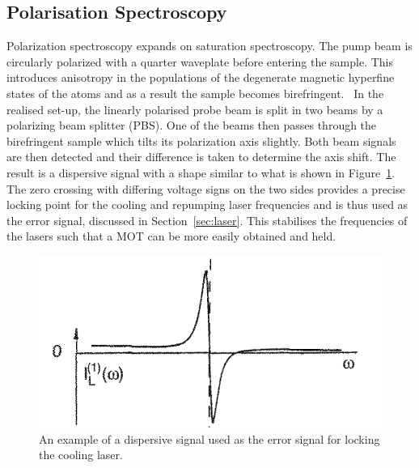 \documentclass[twocolumn]{article}
\begin{document}
\subsection{Polarisation Spectroscopy} \label{sec:pol} %
Polarization spectroscopy expands on saturation spectroscopy. The pump beam is circularly polarized with a quarter waveplate before entering the sample. This introduces anisotropy in the populations of the degenerate magnetic hyperfine states of the atoms and as a result the sample becomes birefringent.~\cite{demtroder} In the realised set-up, the linearly polarised probe beam is split in two beams by a polarizing beam splitter (PBS). One of the beams then passes through the birefringent sample which tilts its polarization axis slightly. Both beam signals are then detected and their difference is taken to determine the axis shift. The result is a dispersive signal with a shape similar to what is shown in Figure~\ref{fig:Dispersive}. The zero crossing with differing voltage signs on the two sides provides a precise locking point for the cooling and repumping laser frequencies and is thus used as the error signal, discussed in Section~\ref{sec:laser}. This stabilises the frequencies of the lasers such that a MOT can be more easily obtained and held.
\begin{figure} [!h]
\centering
\includegraphics[width=1\linewidth]{Images/Dispersive.png}
\caption{An example of a dispersive signal used as the error signal for locking the cooling laser.~\cite{demtroder}}
\label{fig:Dispersive}
\end{figure}
\end{document}
